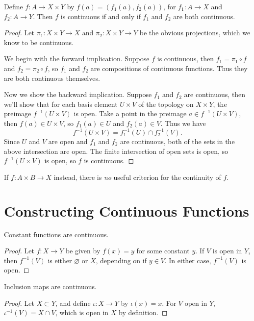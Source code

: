 \documentclass[10pt]{report}
\begin{document}
\begin{thrm}
	Define $f:A\to X \times Y$ by $f(a)=(f_1(a), f_2(a))$, for $f_1:A\to X$ and $f_2:A\to Y$. Then $f$ is continuous if and only if $f_1$ and $f_2$ are both continuous.
\end{thrm}
\begin{proof}
	Let $\pi_1:X\times Y\to X$ and $\pi_2:X\times Y\to Y$ be the obvious projections, which we know to be continuous.

	We begin with the forward implication. Suppose $f$ is continuous, then $f_1=\pi_1 \circ f$ and $f_2=\pi_2 \circ f$, so $f_1$ and $f_2$ are compositions of continuous functions. Thus they are both continuous themselves.

	Now we show the backward implication. Suppose $f_1$ and $f_2$ are continuous, then we'll show that for each basis element $U \times V$ of the topology on $X \times Y$, the preimage $f^{-1}(U \times V)$ is open. Take a point in the preimage $a \in f^{-1}(U \times V)$, then $f(a) \in U \times V$, so $f_1(a) \in U$ and $f_2(a) \in V$. Thus we have
	\[
		f^{-1}(U \times V) = f_1^{-1}(U) \cap f_2^{-1}(V).
	\] Since $U$ and $V$ are open and $f_1$ and $f_2$ are continuous, both of the sets in the above intersection are open. The finite intersection of open sets is open, so $f^{-1}(U\times V)$ is open, so $f$ is continuous.
\end{proof}

\begin{note}
	If $f:A\times B\to X$ instead, there is \textit{no} useful criterion for the continuity of $f$.
\end{note}


\section{Constructing Continuous Functions}

\begin{prop}
Constant functions are continuous.
\end{prop}
\begin{proof}
	Let $f:X\to Y$ be given by $f(x)=y$ for some constant $y$. If $V$ is open in $Y$, then $f^{-1}(V)$ is either $\varnothing$ or $X$, depending on if $y \in V$. In either case, $f^{-1}(V)$ is open.
\end{proof}

\begin{prop}
Inclusion maps are continuous.
\end{prop}
\begin{proof}
	Let $X \subset Y$, and define $\iota:X\to Y$ by $\iota(x)=x$. For $V$ open in $Y$, $\iota^{-1}(V)=X \cap V$, which is open in $X$ by definition.
\end{proof}
\end{document}
